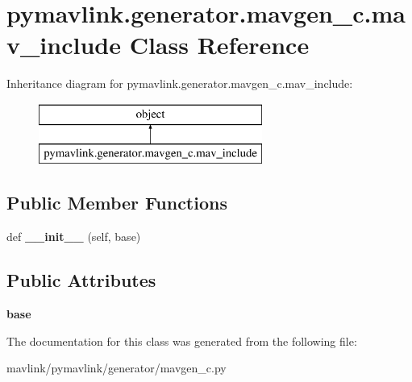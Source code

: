 \hypertarget{classpymavlink_1_1generator_1_1mavgen__c_1_1mav__include}{}\section{pymavlink.\+generator.\+mavgen\+\_\+c.\+mav\+\_\+include Class Reference}
\label{classpymavlink_1_1generator_1_1mavgen__c_1_1mav__include}
Inheritance diagram for pymavlink.\+generator.\+mavgen\+\_\+c.\+mav\+\_\+include\+:\begin{figure}[H]
\begin{center}
\leavevmode
\includegraphics[height=2.000000cm]{classpymavlink_1_1generator_1_1mavgen__c_1_1mav__include}
\end{center}
\end{figure}
\subsection*{Public Member Functions}
\begin{DoxyCompactItemize}
\item 
\mbox{\label{classpymavlink_1_1generator_1_1mavgen__c_1_1mav__include_a5cf023f53ba8bf561b4dfe7f7677dffd}} 
def {\bfseries \+\_\+\+\_\+init\+\_\+\+\_\+} (self, base)
\end{DoxyCompactItemize}
\subsection*{Public Attributes}
\begin{DoxyCompactItemize}
\item 
\mbox{\label{classpymavlink_1_1generator_1_1mavgen__c_1_1mav__include_a4b156838c0def042a0fbfa72b890f7cb}} 
{\bfseries base}
\end{DoxyCompactItemize}


The documentation for this class was generated from the following file\+:\begin{DoxyCompactItemize}
\item 
mavlink/pymavlink/generator/mavgen\+\_\+c.\+py\end{DoxyCompactItemize}
